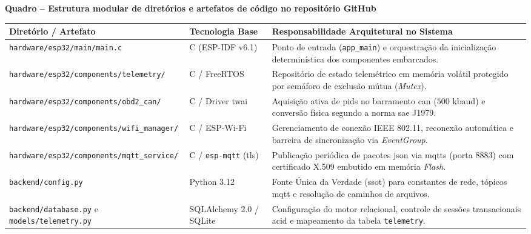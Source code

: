 \documentclass[
	12pt,				%
	openright,			%
	twoside,			%
	a4paper,			%
	english,			%
	brazil				%
	]{abntex2}
\newcounter{quadro}
\begin{document}
\begin{table}[!htb]
\centering
{}\label{quad:repo_estrutura}
{\footnotesize
\textbf{Quadro \thequadro{} -- Estrutura modular de diretórios e artefatos de código no
repositório GitHub}\par}
\vspace{4pt}
{\footnotesize
\begin{tabular}{|>{\raggedright\arraybackslash}p{4.3cm}|>{\raggedright\arraybackslash}p{2.7cm}|>{\raggedright\arraybackslash}p{6.8cm}|}
\hline
\textbf{Diretório / Artefato} & \textbf{Tecnologia Base}
    & \textbf{Responsabilidade Arquitetural no Sistema} \\ \hline
\texttt{hardware/\allowbreak esp32/\allowbreak main/main.c} & C (ESP-IDF v6.1)
    & Ponto de entrada (\texttt{app\_main}) e orquestração da inicialização
    determinística dos componentes embarcados. \\ \hline
\texttt{hardware/\allowbreak esp32/\allowbreak components/\allowbreak telemetry/}
    & C / FreeRTOS
    & Repositório de estado telemétrico em memória volátil protegido por semáforo de
    exclusão mútua (\textit{Mutex}). \\ \hline
\texttt{hardware/\allowbreak esp32/\allowbreak components/\allowbreak obd2\_can/}
    & C / Driver \acrshort{twai}
    & Aquisição ativa de \acrshort{pid}s no barramento \acrshort{can}
    ($500\text{ kbaud}$) e conversão física segundo a norma \acrshort{sae} J1979. \\
    \hline
\texttt{hardware/\allowbreak esp32/\allowbreak components/\allowbreak wifi\_manager/}
    & C / ESP-Wi-Fi
    & Gerenciamento de conexão IEEE 802.11, reconexão automática e barreira de
    sincronização via \textit{EventGroup}. \\ \hline
\texttt{hardware/\allowbreak esp32/\allowbreak components/\allowbreak mqtt\_service/}
    & C / \texttt{esp-mqtt} (\acrshort{tls})
    & Publicação periódica de pacotes \acrshort{json} via \acrshort{mqtts} (porta 8883)
    com certificado X.509 embutido em memória \textit{Flash}. \\ \hline
\texttt{backend/\allowbreak config.py} & Python 3.12
    & Fonte Única da Verdade (\acrshort{ssot}) para constantes de rede, tópicos
    \acrshort{mqtt} e resolução de caminhos de arquivos. \\ \hline
\texttt{backend/\allowbreak database.py} e \texttt{models/\allowbreak telemetry.py}
    & SQLAlchemy 2.0 / SQLite
    & Configuração do motor relacional, controle de sessões transacionais
    \acrshort{acid} e mapeamento da tabela \texttt{telemetry}. \\ \hline

\end{tabular}}
\end{table}
\end{document}

